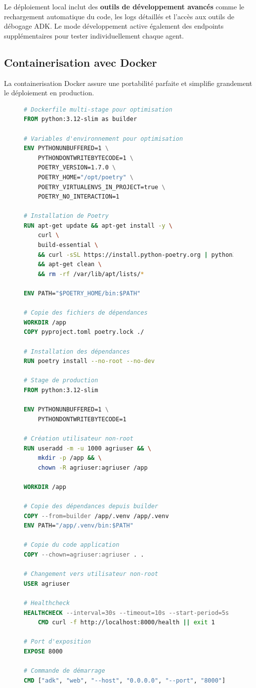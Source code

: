 Le déploiement local inclut des \textbf{outils de développement avancés} comme le rechargement automatique du code, les logs détaillés et l'accès aux outils de débogage ADK. Le mode développement active également des endpoints supplémentaires pour tester individuellement chaque agent.

\subsection{Containerisation avec Docker}

La containerisation Docker assure une portabilité parfaite et simplifie grandement le déploiement en production.

\begin{figure}[H]
\centering
\begin{lstlisting}[language=Dockerfile, caption=Docker optimisé pour Agriculture Cameroun]
# Dockerfile multi-stage pour optimisation
FROM python:3.12-slim as builder

# Variables d'environnement pour optimisation
ENV PYTHONUNBUFFERED=1 \
    PYTHONDONTWRITEBYTECODE=1 \
    POETRY_VERSION=1.7.0 \
    POETRY_HOME="/opt/poetry" \
    POETRY_VIRTUALENVS_IN_PROJECT=true \
    POETRY_NO_INTERACTION=1

# Installation de Poetry
RUN apt-get update && apt-get install -y \
    curl \
    build-essential \
    && curl -sSL https://install.python-poetry.org | python3 - \
    && apt-get clean \
    && rm -rf /var/lib/apt/lists/*

ENV PATH="$POETRY_HOME/bin:$PATH"

# Copie des fichiers de dépendances
WORKDIR /app
COPY pyproject.toml poetry.lock ./

# Installation des dépendances
RUN poetry install --no-root --no-dev

# Stage de production
FROM python:3.12-slim

ENV PYTHONUNBUFFERED=1 \
    PYTHONDONTWRITEBYTECODE=1

# Création utilisateur non-root
RUN useradd -m -u 1000 agriuser && \
    mkdir -p /app && \
    chown -R agriuser:agriuser /app

WORKDIR /app

# Copie des dépendances depuis builder
COPY --from=builder /app/.venv /app/.venv
ENV PATH="/app/.venv/bin:$PATH"

# Copie du code application
COPY --chown=agriuser:agriuser . .

# Changement vers utilisateur non-root
USER agriuser

# Healthcheck
HEALTHCHECK --interval=30s --timeout=10s --start-period=5s --retries=3 \
    CMD curl -f http://localhost:8000/health || exit 1

# Port d'exposition
EXPOSE 8000

# Commande de démarrage
CMD ["adk", "web", "--host", "0.0.0.0", "--port", "8000"]
\end{lstlisting}
\end{figure}

